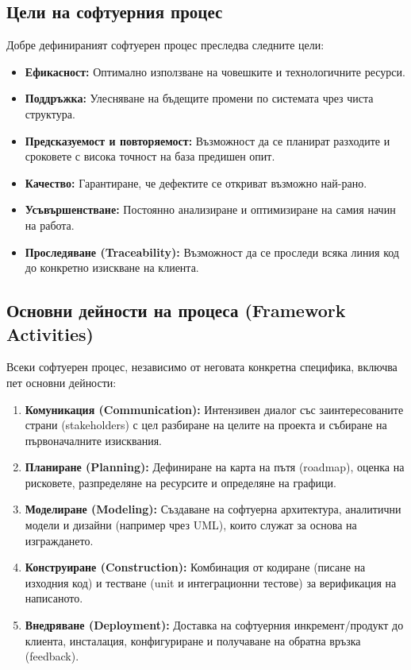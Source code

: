 \documentclass{scrartcl}
\begin{document}
\begin{FlushLeft}
\subsection{Цели на софтуерния процес}
Добре дефинираният софтуерен процес преследва следните цели:
\begin{itemize}
    \item \textbf{Ефикасност:} Оптимално използване на човешките и технологичните ресурси.
    \item \textbf{Поддръжка:} Улесняване на бъдещите промени по системата чрез чиста структура.
    \item \textbf{Предсказуемост и повторяемост:} Възможност да се планират разходите и сроковете с висока точност на база предишен опит.
    \item \textbf{Качество:} Гарантиране, че дефектите се откриват възможно най-рано.
    \item \textbf{Усъвършенстване:} Постоянно анализиране и оптимизиране на самия начин на работа.
    \item \textbf{Проследяване (Traceability):} Възможност да се проследи всяка линия код до конкретно изискване на клиента.
\end{itemize}

\subsection{Основни дейности на процеса (Framework Activities)}
Всеки софтуерен процес, независимо от неговата конкретна специфика, включва пет основни дейности:
\begin{enumerate}
    \item \textbf{Комуникация (Communication):} Интензивен диалог със заинтересованите страни (stakeholders) с цел разбиране на целите на проекта и събиране на първоначалните изисквания.
    \item \textbf{Планиране (Planning):} Дефиниране на карта на пътя (roadmap), оценка на рисковете, разпределяне на ресурсите и определяне на графици.
    \item \textbf{Моделиране (Modeling):} Създаване на софтуерна архитектура, аналитични модели и дизайни (например чрез UML), които служат за основа на изграждането.
    \item \textbf{Конструиране (Construction):} Комбинация от кодиране (писане на изходния код) и тестване (unit и интеграционни тестове) за верификация на написаното.
    \item \textbf{Внедряване (Deployment):} Доставка на софтуерния инкремент/продукт до клиента, инсталация, конфигуриране и получаване на обратна връзка (feedback).
\end{enumerate}


\end{FlushLeft}
\end{document}
